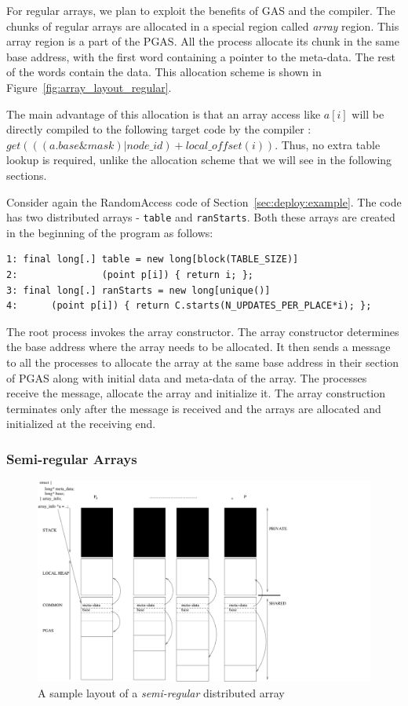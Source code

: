 For regular arrays, we plan to exploit the benefits of GAS and the compiler.
The chunks of regular arrays are allocated in a special region called {\em array}
region. This array region is a part of the PGAS. All the process allocate its
chunk in the same base address, with the first word containing a pointer to 
the meta-data. The rest of the words contain the data. This allocation scheme is shown in Figure~\ref{fig:array_layout_regular}.

The main advantage of this allocation is that an array access like $a[i]$ will
be directly compiled to the following target code by the compiler : $get(((a.base \& mask) | node\_id) + local\_offset(i))$.
Thus, no extra table lookup is required, unlike the allocation scheme that we will see in the following
sections.

Consider again the RandomAccess code of Section~\ref{sec:deploy:example}. The code
has two distributed arrays - {\tt table} and {\tt ranStarts}. Both these arrays
are created in the beginning of the program as follows:

\begin{verbatim}
1: final long[.] table = new long[block(TABLE_SIZE)] 
2:               (point p[i]) { return i; };
3: final long[.] ranStarts = new long[unique()]
4:		(point p[i]) { return C.starts(N_UPDATES_PER_PLACE*i); };
\end{verbatim}

The root process invokes the array constructor. The array constructor
determines the base address where the array needs to be allocated. It then
sends a message to all the processes to allocate the array at the same
base address in their section of PGAS along with initial data
and meta-data of the array. The processes receive the message,
allocate the array and initialize it. The array construction terminates only
after the message is received and the arrays are allocated and initialized
at the receiving end.

\subsubsection{Semi-regular Arrays}

\begin{figure}
\center
\includegraphics[scale=0.5]{figs/ARRAY-SEMI.pdf}
\caption{A sample layout of a {\em semi-regular} distributed array}
\label{fig:array_layout_semiregular}
\end{figure}


